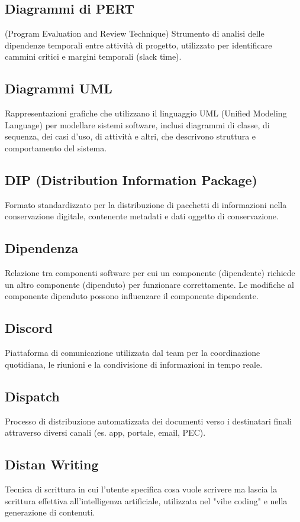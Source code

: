 \documentclass[a4paper,11pt]{article}
\begin{document}
\subsection{Diagrammi di PERT}
(Program Evaluation and Review Technique) Strumento di analisi delle dipendenze temporali entre attività di progetto, utilizzato per identificare cammini critici e margini temporali (slack time).

\subsection{Diagrammi UML}
Rappresentazioni grafiche che utilizzano il linguaggio UML (Unified Modeling Language) per modellare sistemi software, inclusi diagrammi di classe, di sequenza, dei casi d'uso, di attività e altri, che descrivono struttura e comportamento del sistema.

\subsection{DIP (Distribution Information Package)}
Formato standardizzato per la distribuzione di pacchetti di informazioni nella conservazione digitale, contenente metadati e dati oggetto di conservazione.

\subsection{Dipendenza}
Relazione tra componenti software per cui un componente (dipendente) richiede un altro componente (dipenduto) per funzionare correttamente. Le modifiche al componente dipenduto possono influenzare il componente dipendente.

\subsection{Discord}
Piattaforma di comunicazione utilizzata dal team per la coordinazione quotidiana, le riunioni e la condivisione di informazioni in tempo reale.

\subsection{Dispatch}
Processo di distribuzione automatizzata dei documenti verso i destinatari finali attraverso diversi canali (es. app, portale, email, PEC).

\subsection{Distan Writing}
Tecnica di scrittura in cui l'utente specifica cosa vuole scrivere ma lascia la scrittura effettiva all'intelligenza artificiale, utilizzata nel "vibe coding" e nella generazione di contenuti.
\end{document}

